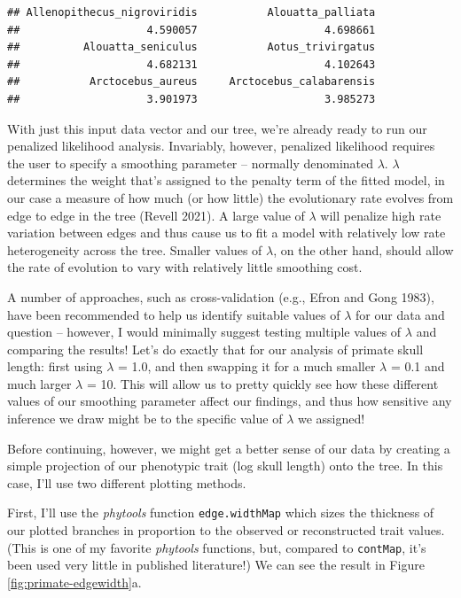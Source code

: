 \documentclass[fleqn,10pt,lineno]{wlpeerj} %
\begin{document}
\begin{verbatim}
## Allenopithecus_nigroviridis           Alouatta_palliata 
##                    4.590057                    4.698661 
##          Alouatta_seniculus           Aotus_trivirgatus 
##                    4.682131                    4.102643 
##           Arctocebus_aureus     Arctocebus_calabarensis 
##                    3.901973                    3.985273
\end{verbatim}

With just this input data vector and our tree, we're already ready to run our penalized likelihood analysis. Invariably, however, penalized likelihood requires the user to specify a smoothing parameter -- normally denominated \(\lambda\). \(\lambda\) determines the weight that's assigned to the penalty term of the fitted model, in our case a measure of how much (or how little) the evolutionary rate evolves from edge to edge in the tree (Revell 2021). A large value of \(\lambda\) will penalize high rate variation between edges and thus cause us to fit a model with relatively low rate heterogeneity across the tree. Smaller values of \(\lambda\), on the other hand, should allow the rate of evolution to vary with relatively little smoothing cost.

A number of approaches, such as cross-validation (e.g., Efron and Gong 1983), have been recommended to help us identify suitable values of \(\lambda\) for our data and question -- however, I would minimally suggest testing multiple values of \(\lambda\) and comparing the results! Let's do exactly that for our analysis of primate skull length: first using \(\lambda\) = 1.0, and then swapping it for a much smaller \(\lambda\) = 0.1 and much larger \(\lambda\) = 10. This will allow us to pretty quickly see how these different values of our smoothing parameter affect our findings, and thus how sensitive any inference we draw might be to the specific value of \(\lambda\) we assigned!

Before continuing, however, we might get a better sense of our data by creating a simple projection of our phenotypic trait (log skull length) onto the tree. In this case, I'll use two different plotting methods.

First, I'll use the \emph{phytools} function \texttt{edge.widthMap} which sizes the thickness of our plotted branches in proportion to the observed or reconstructed trait values. (This is one of my favorite \emph{phytools} functions, but, compared to \texttt{contMap}, it's been used very little in published literature!) We can see the result in Figure \ref{fig:primate-edgewidth}a.
\end{document}
